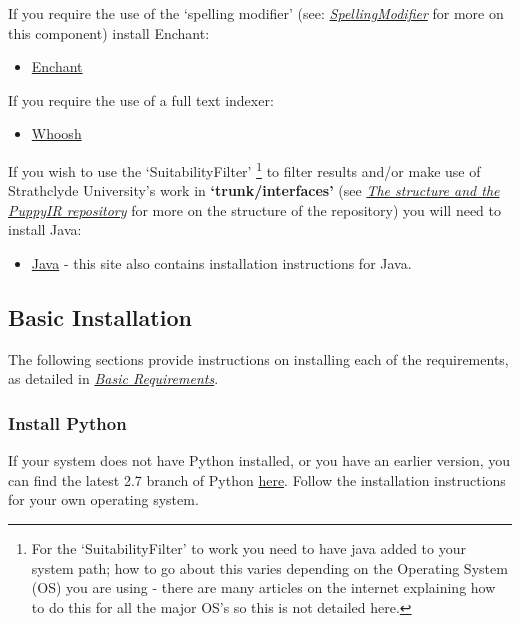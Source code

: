 \documentclass[letterpaper,10pt,english]{sphinxmanual}
\begin{document}
If you require the use of the `spelling modifier' (see: {\hyperref[api3.0:puppy-spelling-mod]{\emph{SpellingModifier}}} for more on this component) install Enchant:
\begin{itemize}
\item {} 
\href{http://packages.python.org/pyenchant/}{Enchant}

\end{itemize}

If you require the use of a full text indexer:
\begin{itemize}
\item {} 
\href{http://pypi.python.org/pypi/Whoosh/\#downloads}{Whoosh}

\end{itemize}

If you wish to use the `SuitabilityFilter' \footnote{
For the `SuitabilityFilter' to work you need to have java added to your system path; how to go about this varies depending on the Operating System (OS) you are using - there are many articles on the internet explaining how to do this for all the major OS's so this is not detailed here.
} to filter results and/or make use of Strathclyde University's work in \textbf{`trunk/interfaces'} (see {\hyperref[repo:repo]{\emph{The structure and the PuppyIR repository}}} for more on the structure of the repository) you will need to install Java:
\begin{itemize}
\item {} 
\href{http://www.oracle.com/technetwork/java/javase/downloads/index.html}{Java}  - this site also contains installation instructions for Java.

\end{itemize}


\subsection{Basic Installation}
\label{installation:basic-installation}
The following sections provide instructions on installing each of the requirements, as detailed in {\hyperref[installation:basic-requirements-label]{\emph{Basic Requirements}}}.


\subsubsection{Install Python}
\label{installation:install-python}
If your system does not have Python installed, or you have an earlier version, you can find the latest 2.7 branch of Python \href{http://python.org/download/}{here}. Follow the installation instructions for your own operating system.
\end{document}
